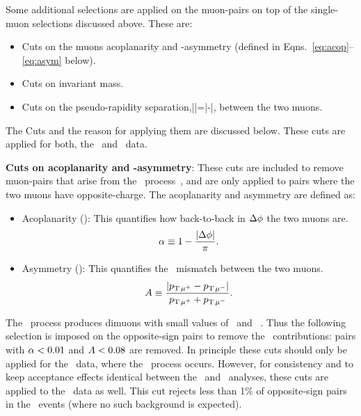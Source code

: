 Some additional selections are applied on the muon-pairs
  on top of the single-muon selections discussed above.
These are:
\begin{itemize}
\item Cuts on the muons acoplanarity and \pt-asymmetry (defined in Eqns.~\ref{eq:acop}--\ref{eq:asym} below). 
\item Cuts on invariant mass.
\item Cuts on the pseudo-rapidity separation,|\Deta|=|\etaa-\etab|, 
      between the two muons.
\end{itemize}
The Cuts and the reason for applying them are discussed below.
These cuts are applied for both, the \PbPb\ and \pp\ data.

\textbf{Cuts on acoplanarity and \pt-asymmetry}:
These cuts are included to remove muon-pairs that arise from 
  the \gamgammumu\ process~\cite{HION-2018-11,HION-2020-10}, and are only applied to
  pairs where the two muons have opposite-charge.
The acoplanarity and asymmetry are defined as:
\begin{itemize}
  \item Acoplanarity (\Aco): This quantifies how back-to-back in $\mbox{$\Delta\phi$}$ the two muons are.
    \begin{eqnarray}
    \mbox{$\alpha$} \equiv 1- \frac{|\Delta\phi|}{\pi}.
    \label{eq:acop}
    \end{eqnarray}
  \item Asymmetry (\Amumu): This quantifies the \pt\ mismatch between the two muons.
  \begin{eqnarray}
  \mbox{$A$} \equiv \frac{|\mbox{$p_{\mathrm{T}\,\mu^{+}}$}-\mbox{$p_{\mathrm{T}\,\mu^{-}}$}|}{\mbox{$p_{\mathrm{T}\,\mu^{+}}$}+\mbox{$p_{\mathrm{T}\,\mu^{-}}$}}.
  \label{eq:asym}
  \end{eqnarray}
\end{itemize}
The \gamgammumu\ process produces dimuons with small values of \Aco\ 
  and \Amumu~\cite{HION-2018-11}.
Thus the following selection is imposed on the opposite-sign pairs 
  to remove the \gamgammumu\ contributions: pairs with $\mbox{$\alpha$}<0.01$ and $\mbox{$A$}<0.08$ are removed.
In principle these cuts should only be applied for the \PbPb\ data, where the \gamgammumu\ process occurs.
However, for consistency and to keep acceptance effects identical 
  between the \pp\ and \PbPb\ analyses, these cuts are applied to the \pp\ data as well.
This cut rejects less than 1\% of opposite-sign pairs in the \pp\ events (where no such background is expected).


